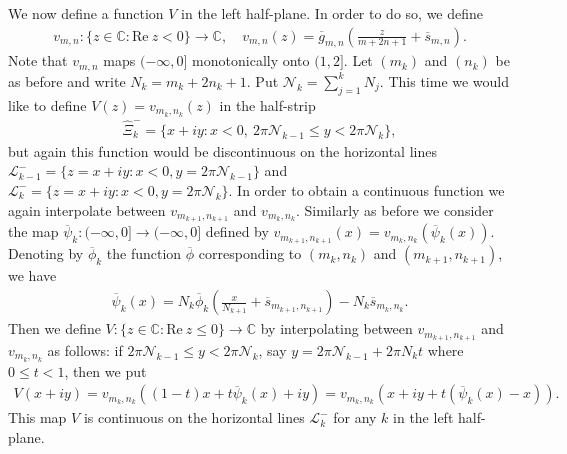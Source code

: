 \documentclass[12pt]{amsart}
\numberwithin{equation}{section}
\begin{document}
We now define a function $V$ in the left half-plane. In order to do so, we define
\begin{equation*}
\begin{split}
v_{m,n}:\{z\in\mathbb{C}: \text{Re}\ z< 0\}\to \mathbb{C},  \quad v_{m,n}(z)=\overline{g}_{m,n}\left(\frac{z}{m+2n+1}+\overline{s}_{m,n}\right).
\end{split}
\end{equation*}
Note that $v_{m,n}$ maps $(-\infty,0]$ monotonically onto $(1,2]$. Let $(m_k)$ and $(n_k)$ be as before and write $N_k=m_k+2n_k+1$. Put $\mathcal{N}_k=\sum_{j=1}^{k}N_j$. This time we would like to define $V(z)=v_{m_k,n_k}(z)$ in the half-strip
\begin{equation*}
\begin{split}
\hat{\Xi}_k^{-}=\{x+iy: x<0, \ 2\pi \mathcal{N}_{k-1}\leq y<2\pi \mathcal{N}_k\},
\end{split}
\end{equation*}
but again this function would be discontinuous on the horizontal lines $\mathcal{L}^{-}_{k-1}=\{z=x+iy: x<0, y=2\pi\mathcal{N}_{k-1}\}$ and $\mathcal{L}^{-}_k=\{z=x+iy: x<0, y=2\pi\mathcal{N}_{k}\}$. In order to obtain a continuous function we again interpolate between $v_{m_{k+1},n_{k+1}}$ and $v_{m_k,n_k}$. Similarly as before we consider the map $\overline{\psi}_k:(-\infty,0]\to (-\infty,0]$ defined by $v_{m_{k+1},n_{k+1}}(x)=v_{m_k,n_k}(\overline{\psi}_k(x))$. Denoting by $\overline{\phi}_k$ the function $\overline{\phi}$ corresponding to $(m_k,n_k)$ and $(m_{k+1},n_{k+1})$, we have
\begin{equation}\label{recuree1-main eqiqu-uy-2}
\begin{split}
\overline{\psi}_k(x)=N_k\overline{\phi}_k\left(\frac{x}{N_{k+1}}+\overline{s}_{m_{k+1},n_{k+1}}\right)-N_k\overline{s}_{m_{k},n_{k}}.
\end{split}
\end{equation}
Then we define $V:\{z\in \mathbb{C}:\text{Re}\ z\leq 0\}\to \mathbb{C}$ by interpolating between $v_{m_{k+1},n_{k+1}}$ and $v_{m_k,n_k}$ as follows: if $2\pi \mathcal{N}_{k-1}\leq y<2\pi \mathcal{N}_k$, say $y=2\pi \mathcal{N}_{k-1}+2\pi N_kt$ where $0\leq t<1$, then we put
\begin{equation*}
\begin{split}
V(x+iy)=v_{m_{k},n_{k}}((1-t)x+t\overline{\psi}_k(x)+iy)=v_{m_{k},n_{k}}(x+iy+t(\overline{\psi}_k(x)-x)).
\end{split}
\end{equation*}
This map $V$ is continuous on the horizontal lines $\mathcal{L}^{-}_k$ for any $k$ in the left half-plane.
\end{document}
